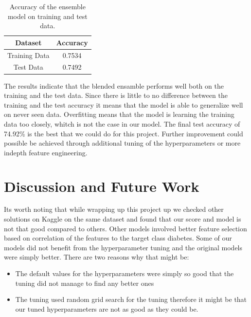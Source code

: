 \documentclass[a4paper,12pt]{article}
\begin{document}
\begin{table}[h]
    \centering
    \begin{tabular}{|c|c|}
        \hline
        \textbf{Dataset} & \textbf{Accuracy} \\
        \hline
        Training Data & 0.7534 \\
        Test Data & 0.7492 \\
        \hline
    \end{tabular}
    \caption{Accuracy of the ensemble model on training and test data.}
    \label{tab:accuracy_results}
\end{table}

The results indicate that the blended ensamble performs well both on the training and the test data. Since there is little to no difference between the training and the test accuracy it means that the model is able to generalize well on never seen data. 
Overfitting means that the model is learning the training data too closely, whitch is not the case in our model.
The final test accuracy of 74.92\% is the best that we could do for this project. 
Further improvement could possible be achieved through additional tuning of the hyperparameters or more indepth feature engineering.




\section{Discussion and Future Work}
Its worth noting that while wrapping up this project up we checked other solutions on Kaggle on the same dataset and found that our score and model is not that good compared to others.
Other models involved better feature selection based on correlation of the features to the target class diabetes.
    Some of our models did not benefit from the hyperparameter tuning and the original models were simply better.
    There are two reasons why that might be:
    \begin{itemize}
        \item The default values for the hyperparameters were simply so good that the tuning did not manage to find any better ones
        \item The tuning used random grid search for the tuning therefore it might be that our tuned hyperparameters are not as good as they could be.
    \end{itemize}
\end{document}
